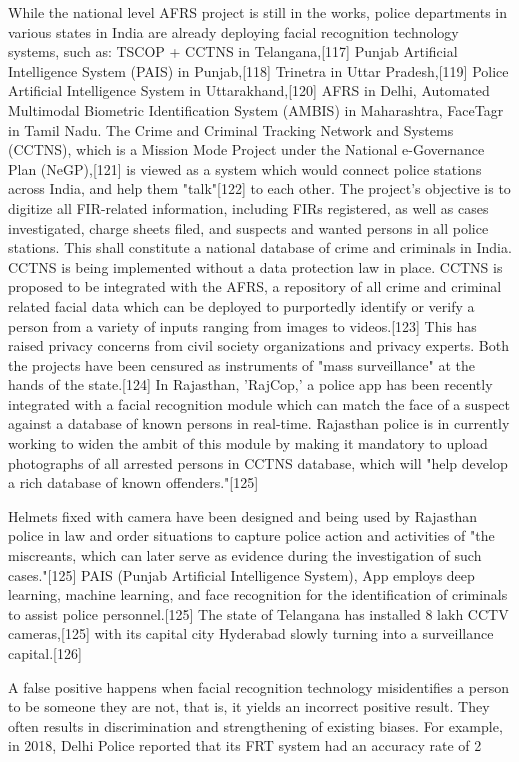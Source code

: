 While the national level AFRS project is still in the works, police departments in various states in India are already deploying facial recognition technology systems, such as: TSCOP + CCTNS in Telangana,[117] Punjab Artificial Intelligence System (PAIS) in Punjab,[118] Trinetra in Uttar Pradesh,[119] Police Artificial Intelligence System in Uttarakhand,[120] AFRS in Delhi, Automated Multimodal Biometric Identification System (AMBIS) in Maharashtra, FaceTagr in Tamil Nadu. The Crime and Criminal Tracking Network and Systems (CCTNS), which is a Mission Mode Project under the National e-Governance Plan (NeGP),[121] is viewed as a system which would connect police stations across India, and help them "talk"[122] to each other. The project's objective is to digitize all FIR-related information, including FIRs registered, as well as cases investigated, charge sheets filed, and suspects and wanted persons in all police stations. This shall constitute a national database of crime and criminals in India. CCTNS is being implemented without a data protection law in place. CCTNS is proposed to be integrated with the AFRS, a repository of all crime and criminal related facial data which can be deployed to purportedly identify or verify a person from a variety of inputs ranging from images to videos.[123] This has raised privacy concerns from civil society organizations and privacy experts. Both the projects have been censured as instruments of "mass surveillance" at the hands of the state.[124] In Rajasthan, 'RajCop,' a police app has been recently integrated with a facial recognition module which can match the face of a suspect against a database of known persons in real-time. Rajasthan police is in currently working to widen the ambit of this module by making it mandatory to upload photographs of all arrested persons in CCTNS database, which will "help develop a rich database of known offenders."[125]

Helmets fixed with camera have been designed and being used by Rajasthan police in law and order situations to capture police action and activities of "the miscreants, which can later serve as evidence during the investigation of such cases."[125] PAIS (Punjab Artificial Intelligence System), App employs deep learning, machine learning, and face recognition for the identification of criminals to assist police personnel.[125] The state of Telangana has installed 8 lakh CCTV cameras,[125] with its capital city Hyderabad slowly turning into a surveillance capital.[126]

A false positive happens when facial recognition technology misidentifies a person to be someone they are not, that is, it yields an incorrect positive result. They often results in discrimination and strengthening of existing biases. For example, in 2018, Delhi Police reported that its FRT system had an accuracy rate of 2%

